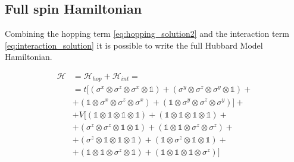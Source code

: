 \documentclass[twoside,twocolumn]{article}
\begin{document}

\subsection{Full spin Hamiltonian}

Combining the hopping term \ref{eq:hopping_solution2} and the interaction term \ref{eq:interaction_solution}
it is possible to write the full Hubbard Model Hamiltonian.

\begin{equation}\label{eq:hubb_hamiltonian_solution_full}
\begin{aligned}
\mathcal{H} &= \mathcal{H}_{hop} + \mathcal{H}_{int} = \\
&= t [ (\sigma^x \otimes \sigma^z \otimes \sigma^x \otimes \mathbb{1}) + (\sigma^y \otimes \sigma^z \otimes \sigma^y \otimes \mathbb{1}) +\\
&+ (\mathbb{1} \otimes \sigma^x \otimes \sigma^z \otimes \sigma^x) + (\mathbb{1} \otimes \sigma^y \otimes \sigma^z \otimes \sigma^y) ] +\\
&+ V [ (\mathbb{1} \otimes \mathbb{1} \otimes \mathbb{1} \otimes \mathbb{1}) + (\mathbb{1} \otimes \mathbb{1} \otimes \mathbb{1} \otimes \mathbb{1}) +\\
&+ (\sigma^z \otimes \sigma^z \otimes \mathbb{1} \otimes \mathbb{1}) + (\mathbb{1} \otimes \mathbb{1} \otimes \sigma^z \otimes \sigma^z) +\\
&+ (\sigma^z \otimes \mathbb{1} \otimes \mathbb{1} \otimes \mathbb{1}) + (\mathbb{1} \otimes \sigma^z \otimes \mathbb{1} \otimes \mathbb{1}) +\\
&+ (\mathbb{1} \otimes \mathbb{1} \otimes \sigma^z \otimes \mathbb{1}) + (\mathbb{1} \otimes \mathbb{1} \otimes \mathbb{1} \otimes \sigma^z) ]
\end{aligned}
\end{equation}\\
\end{document}
